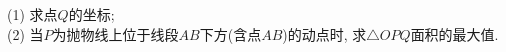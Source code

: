 \documentclass[10pt,a4paper]{article}
\begin{document}
\begin{enumerate}[1.]
\begin{center}
\begin{tikzpicture}[>=latex,scale = 0.2]
    \end{tikzpicture}
\end{center}
(1) 求点$Q$的坐标;\\
(2) 当$P$为抛物线上位于线段$AB$下方(含点$AB$)的动点时, 求$\triangle OPQ$面积的最大值.


\end{enumerate}
\end{document}
